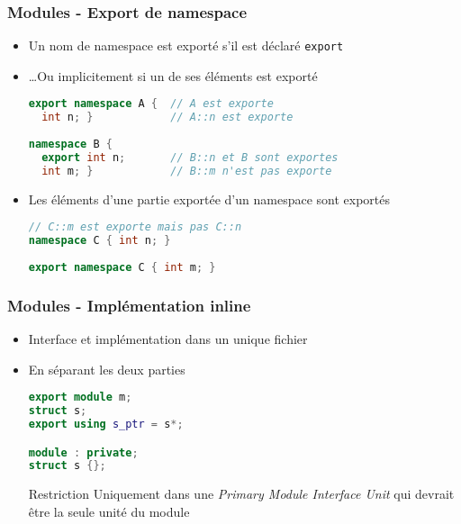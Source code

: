 \documentclass[C++.tex]{subfiles}
\begin{document}
\begin{frame}[fragile]
	\frametitle{Modules - Export de namespace}
	\begin{itemize}
		\item Un nom de namespace est exporté s'il est déclaré \lstinline|export|
		\item \ldots Ou implicitement si un de ses éléments est exporté
	
		\begin{lstlisting}[language=C++]
export namespace A {  // A est exporte
  int n; }            // A::n est exporte
	
namespace B {
  export int n;       // B::n et B sont exportes
  int m; }            // B::m n'est pas exporte\end{lstlisting}
	
		\item Les éléments d'une partie exportée d'un namespace sont exportés
	
		\begin{lstlisting}[language=C++]
// C::m est exporte mais pas C::n
namespace C { int n; }
	
export namespace C { int m; }\end{lstlisting}
	\end{itemize}
\end{frame}

\begin{frame}[fragile]
	\frametitle{Modules - Implémentation inline}
	\begin{itemize}
		\item Interface et implémentation dans un unique fichier
		\item En séparant les deux parties

		\begin{lstlisting}[language=C++]
export module m;
struct s;
export using s_ptr = s*;

module : private;
struct s {};\end{lstlisting}

		\pause

		\begin{alertblock}{Restriction}
			Uniquement dans une \textit{Primary Module Interface Unit} qui devrait être la seule unité du module
		\end{alertblock}
	\end{itemize}
\end{frame}
\end{document}

